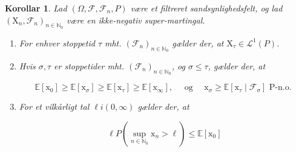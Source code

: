 \documentclass{article}
\newcommand{\1}{\mathbbm{1}}
\theoremstyle{boxed}
\newtheorem{corollary}[theorem]{Korollar}
\begin{document}
\begin{theorem-box}
    \begin{corollary}
        Lad $\left(\Omega, \mathcal{F}, \mathcal{F}_n, P\right)$ være et filtreret sandsynlighedsfelt, og lad $\left(\mathrm{X}_n, \mathcal{F}_n\right)_{n \in \mathbb{N}_0}$ være en ikke-negativ super-martingal.
\begin{enumerate}
    \item[\textnormal{(i)}] For enhver stoppetid $\tau$ mht. $\left(\mathcal{F}_n\right)_{n \in \mathbb{N}_0}$ gælder der, at $\mathrm{X}_\tau \in \mathcal{L}^1(P)$.
    \item[\textnormal{(ii)}] Hvis $\sigma, \tau$ er stoppetider mht. $\left(\mathcal{F}_n\right)_{n \in \mathbb{N}_0}$, og $\sigma \leq \tau$, gælder der, at

$$
\mathbb{E}\left[\mathrm{x}_0\right] \geq \mathbb{E}\left[\mathrm{x}_\sigma\right] \geq \mathbb{E}\left[\mathrm{x}_\tau\right] \geq \mathbb{E}\left[\mathrm{x}_{\infty}\right], \quad \text { og } \quad \mathrm{x}_\sigma \geq \mathbb{E}\left[\mathrm{x}_\tau \mid \mathcal{F}_\sigma\right] \text { P-n.o. }
$$
    \item[\textnormal{(iii)}] For et vilkårligt tal $\ell i(0, \infty)$ gælder der, at

$$
\ell P\left(\sup _{n \in \mathbb{N}_0} \mathrm{x}_n>\ell\right) \leq \mathbb{E}\left[\mathrm{x}_0\right]
$$
\end{enumerate}
    \end{corollary}
\end{theorem-box}
\end{document}
